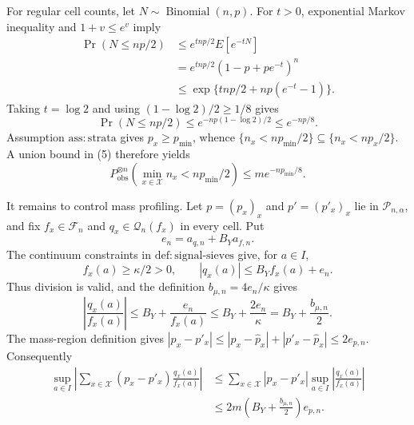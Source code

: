 For regular cell counts, let \(N\sim\operatorname{Binomial}(n,p)\).  For
\(t>0\), exponential Markov inequality and \(1+v\le e^v\) imply
\[
 \begin{aligned}
 \Pr(N\le np/2)
 &\le e^{tnp/2}E[e^{-tN}]\\
 &=e^{tnp/2}(1-p+pe^{-t})^n\\
 &\le\exp\{tnp/2+np(e^{-t}-1)\}.
 \end{aligned}                                                       \tag{4}
\]
Taking \(t=\log2\) and using \((1-\log2)/2\ge1/8\) gives
\[
 \Pr(N\le np/2)\le e^{-np(1-\log2)/2}\le e^{-np/8}.              \tag{5}
\]
Assumption \(\mathrm{ass{:}strata}\) gives \(p_x\ge p_{\min}\), whence
\(\{n_x<np_{\min}/2\}\subseteq\{n_x<np_x/2\}\).  A union bound in (5)
therefore yields
\[
 P_{\mathrm{obs}}^{\otimes n}
 \left(\min_{x\in\mathcal X}n_x<np_{\min}/2\right)
 \le m e^{-np_{\min}/8}.                                         \tag{6}
\]

It remains to control mass profiling.  Let \(p=(p_x)_x\) and
\(p'=(p'_x)_x\) lie in \(\mathcal P_{n,\alpha}\), and fix
\(f_x\in\mathscr F_n\) and \(q_x\in\mathscr Q_n(f_x)\) in every cell.  Put
\[
 e_n=a_{q,n}+B_Ya_{f,n}.
\]
The continuum constraints in \(\mathrm{def{:}signal\text{-}sieves}\) give,
for \(a\in I\),
\[
 f_x(a)\ge\kappa/2>0,
 \qquad |q_x(a)|\le B_Yf_x(a)+e_n.                                 \tag{7}
\]
Thus division is valid, and the definition
\(b_{\mu,n}=4e_n/\kappa\) gives
\[
 \left|\frac{q_x(a)}{f_x(a)}\right|
 \le B_Y+\frac{e_n}{f_x(a)}
 \le B_Y+\frac{2e_n}{\kappa}
 =B_Y+\frac{b_{\mu,n}}2.                                          \tag{8}
\]
The mass-region definition gives
\(|p_x-p'_x|\le|p_x-\widehat p_x|+|p'_x-\widehat p_x|\le2e_{p,n}\).
Consequently
\[
 \begin{aligned}
 \sup_{a\in I}\left|
 \sum_{x\in\mathcal X}(p_x-p'_x)\frac{q_x(a)}{f_x(a)}\right|
 &\le\sum_{x\in\mathcal X}|p_x-p'_x|
       \sup_{a\in I}\left|\frac{q_x(a)}{f_x(a)}\right|\\
 &\le2m\left(B_Y+\frac{b_{\mu,n}}2\right)e_{p,n}.                \tag{9}
 \end{aligned}
\]

